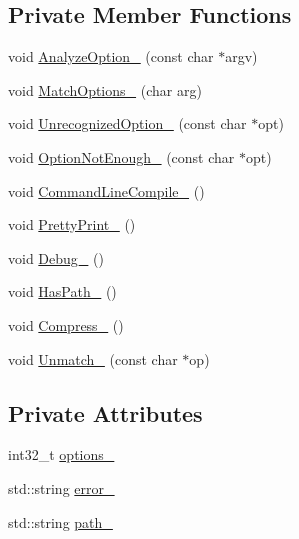 \subsection*{Private Member Functions}
\begin{DoxyCompactItemize}
\item 
void \hyperlink{classmocha_1_1_options_ac3fccb490c0f2dab1a41749f773b661a}{AnalyzeOption\_\-} (const char $\ast$argv)
\item 
void \hyperlink{classmocha_1_1_options_ac40c6e5756b77c71e12671174423fa0d}{MatchOptions\_\-} (char arg)
\item 
void \hyperlink{classmocha_1_1_options_a7e8d315b40d0bec0621036051c0b2796}{UnrecognizedOption\_\-} (const char $\ast$opt)
\item 
void \hyperlink{classmocha_1_1_options_ae913cc1987c2390f470afb57b69dc796}{OptionNotEnough\_\-} (const char $\ast$opt)
\item 
void \hyperlink{classmocha_1_1_options_af96d758a22ba5803953be57a0d1f76ce}{CommandLineCompile\_\-} ()
\item 
void \hyperlink{classmocha_1_1_options_ae45da1a2425fa91a545941811b4b1231}{PrettyPrint\_\-} ()
\item 
void \hyperlink{classmocha_1_1_options_a1937122e931cb8715a8da23a797df18b}{Debug\_\-} ()
\item 
void \hyperlink{classmocha_1_1_options_ade45c0925f8acbfe8addbfc5c254772d}{HasPath\_\-} ()
\item 
void \hyperlink{classmocha_1_1_options_aff0c6b3baa05971050a9cfd21520a864}{Compress\_\-} ()
\item 
void \hyperlink{classmocha_1_1_options_aed2a5df0fa95a0995c7764678c1057cb}{Unmatch\_\-} (const char $\ast$op)
\end{DoxyCompactItemize}
\subsection*{Private Attributes}
\begin{DoxyCompactItemize}
\item 
int32\_\-t \hyperlink{classmocha_1_1_options_a0d25bc46d6f426be00ae99527190c4c1}{options\_\-}
\item 
std::string \hyperlink{classmocha_1_1_options_a38cd36a24de169f60220e2b0faabf730}{error\_\-}
\item 
std::string \hyperlink{classmocha_1_1_options_acecff880bcf3d91590fa39665c2ec6ab}{path\_\-}
\end{DoxyCompactItemize}


